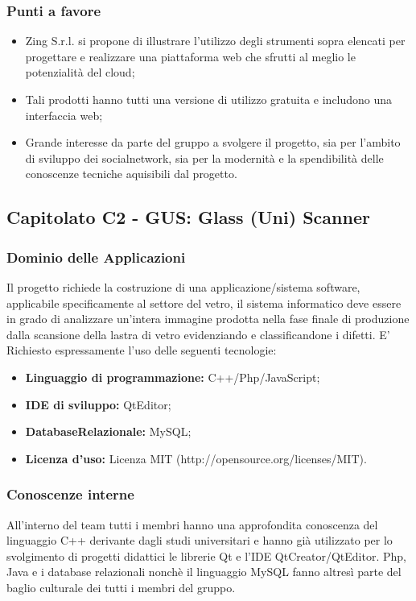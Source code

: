   \subsubsection{Punti a favore}
  \begin{itemize}
     \item Zing S.r.l. si propone di illustrare l’utilizzo degli strumenti sopra elencati per progettare e realizzare una piattaforma web che sfrutti al meglio le potenzialità del cloud;
     \item Tali prodotti hanno tutti una versione di utilizzo gratuita e includono una interfaccia web;
     \item Grande interesse da parte del gruppo a svolgere il progetto, sia per l'ambito di sviluppo dei socialnetwork, sia per la modernità e la spendibilità delle conoscenze tecniche aquisibili dal progetto.
  \end{itemize}
\subsection{Capitolato C2 - GUS: Glass (Uni) Scanner}
  \subsubsection{Dominio delle Applicazioni}
  Il progetto richiede la costruzione di una applicazione/sistema software, applicabile specificamente al settore del vetro, il  sistema  informatico deve essere in grado di analizzare un'intera immagine prodotta nella fase finale di produzione dalla scansione della lastra di vetro evidenziando e classificandone i difetti. E' Richiesto espressamente l'uso delle seguenti tecnologie:
  \begin{itemize}
  	\item \textbf{Linguaggio  di  programmazione:} C++/Php/JavaScript;
  	\item \textbf{IDE di sviluppo:} QtEditor;
  	\item \textbf{DatabaseRelazionale:} MySQL;
  	\item \textbf{Licenza d'uso:} Licenza MIT (http://opensource.org/licenses/MIT).
  \end{itemize}
  \subsubsection{Conoscenze interne}
  All'interno del team tutti i membri hanno una approfondita conoscenza del linguaggio C++ derivante dagli studi universitari e hanno già utilizzato per lo svolgimento di progetti didattici le librerie Qt e l'IDE QtCreator/QtEditor. Php, Java e i database relazionali nonchè il linguaggio MySQL fanno altresì parte del baglio culturale dei tutti i membri del gruppo.
